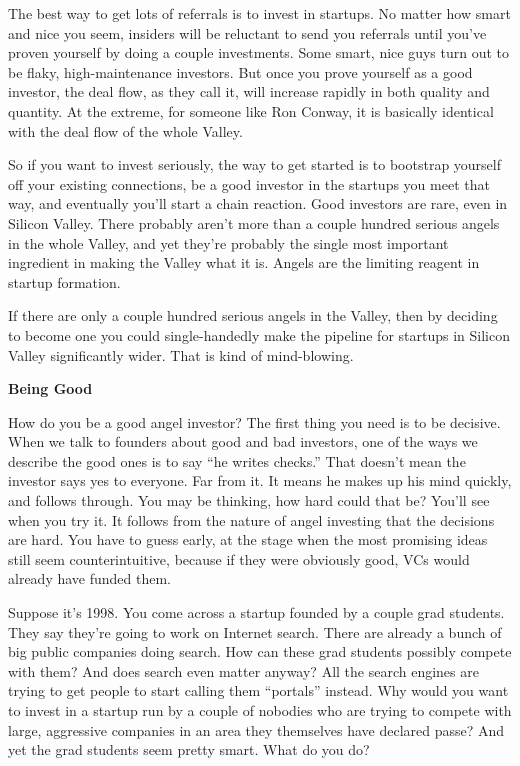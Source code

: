 The best way to get lots of referrals is to invest in startups. No
matter how smart and nice you seem, insiders will be reluctant to send
you referrals until you've proven yourself by doing a couple
investments. Some smart, nice guys turn out to be flaky,
high-maintenance investors. But once you prove yourself as a good
investor, the deal flow, as they call it, will increase rapidly in both
quality and quantity. At the extreme, for someone like Ron Conway, it is
basically identical with the deal flow of the whole Valley.

So if you want to invest seriously, the way to get started is to
bootstrap yourself off your existing connections, be a good investor in
the startups you meet that way, and eventually you'll start a chain
reaction. Good investors are rare, even in Silicon Valley. There
probably aren't more than a couple hundred serious angels in the whole
Valley, and yet they're probably the single most important ingredient in
making the Valley what it is. Angels are the limiting reagent in startup
formation.

If there are only a couple hundred serious angels in the Valley, then by
deciding to become one you could single-handedly make the pipeline for
startups in Silicon Valley significantly wider. That is kind of
mind-blowing.

\textbf{Being Good}

How do you be a good angel investor? The first thing you need is to be
decisive. When we talk to founders about good and bad investors, one of
the ways we describe the good ones is to say ``he writes checks.'' That
doesn't mean the investor says yes to everyone. Far from it. It means he
makes up his mind quickly, and follows through. You may be thinking, how
hard could that be? You'll see when you try it. It follows from the
nature of angel investing that the decisions are hard. You have to guess
early, at the stage when the most promising ideas still seem
counterintuitive, because if they were obviously good, VCs would already
have funded them.

Suppose it's 1998. You come across a startup founded by a couple grad
students. They say they're going to work on Internet search. There are
already a bunch of big public companies doing search. How can these grad
students possibly compete with them? And does search even matter anyway?
All the search engines are trying to get people to start calling them
``portals'' instead. Why would you want to invest in a startup run by a
couple of nobodies who are trying to compete with large, aggressive
companies in an area they themselves have declared passe? And yet the
grad students seem pretty smart. What do you do?


